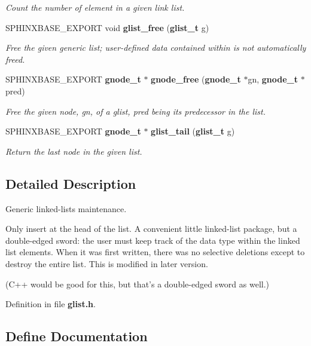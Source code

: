 \begin{CompactItemize}
\begin{CompactList}\small\item\em Count the number of element in a given link list. \item\end{CompactList}\item 
SPHINXBASE\_\-EXPORT void {\bf glist\_\-free} ({\bf glist\_\-t} g)
\begin{CompactList}\small\item\em Free the given generic list; user-defined data contained within is not automatically freed. \item\end{CompactList}\item 
SPHINXBASE\_\-EXPORT {\bf gnode\_\-t} $\ast$ {\bf gnode\_\-free} ({\bf gnode\_\-t} $\ast$gn, {\bf gnode\_\-t} $\ast$pred)
\begin{CompactList}\small\item\em Free the given node, gn, of a glist, pred being its predecessor in the list. \item\end{CompactList}\item 
SPHINXBASE\_\-EXPORT {\bf gnode\_\-t} $\ast$ {\bf glist\_\-tail} ({\bf glist\_\-t} g)\label{glist_8h_6921d6b8b11cb9e05fadeaa091e89234}

\begin{CompactList}\small\item\em Return the last node in the given list. \item\end{CompactList}\end{CompactItemize}


\subsection{Detailed Description}
Generic linked-lists maintenance. 

Only insert at the head of the list. A convenient little linked-list package, but a double-edged sword: the user must keep track of the data type within the linked list elements. When it was first written, there was no selective deletions except to destroy the entire list. This is modified in later version.

(C++ would be good for this, but that's a double-edged sword as well.) 

Definition in file {\bf glist.h}.

\subsection{Define Documentation}
